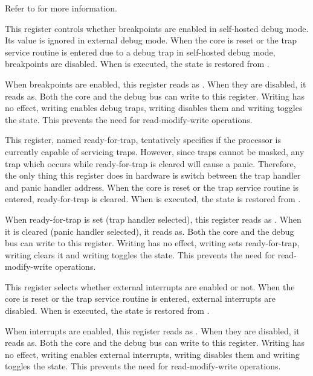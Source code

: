 Refer to  for more information.

\debugCanWrite{}
\coreCanWrite{}
This register controls whether breakpoints are enabled in self-hosted debug 
mode. Its value is ignored in external debug mode. When the core is reset or the 
trap service routine is entered due to a debug trap in self-hosted debug mode, 
breakpoints are disabled. When  is executed, the state is restored 
from .

When breakpoints are enabled, this register reads as . When they are 
disabled, it reads as. Both the core and the debug bus can write to 
this register. Writing  has no effect, writing  enables debug 
traps, writing  disables them and writing  toggles the state. 
This prevents the need for read-modify-write operations.

\debugCanWrite{}
\coreCanWrite{}
This register, named ready-for-trap, tentatively specifies if the processor is
currently capable of servicing traps. However, since traps cannot be masked,
any trap which occurs while ready-for-trap is cleared will cause a panic.
Therefore, the only thing this register does in hardware is switch between the
trap handler and panic handler address. When the core is reset or the trap
service routine is entered, ready-for-trap is cleared. When  is 
executed, the state is restored from .

When ready-for-trap is set (trap handler selected), this register reads as 
. When it is cleared (panic handler selected), it reads as. 
Both the core and the debug bus can write to this register. Writing  
has no effect, writing  sets ready-for-trap, writing  clears 
it and writing  toggles the state. This prevents the need for 
read-modify-write operations.

\debugCanWrite{}
\coreCanWrite{}
This register selects whether external interrupts are enabled or not. When the 
core is reset or the trap service routine is entered, external interrupts are 
disabled. When  is executed, the state is restored from .

When interrupts are enabled, this register reads as . When they are 
disabled, it reads as. Both the core and the debug bus can write to 
this register. Writing  has no effect, writing  enables 
external interrupts, writing  disables them and writing  
toggles the state. This prevents the need for read-modify-write operations.

